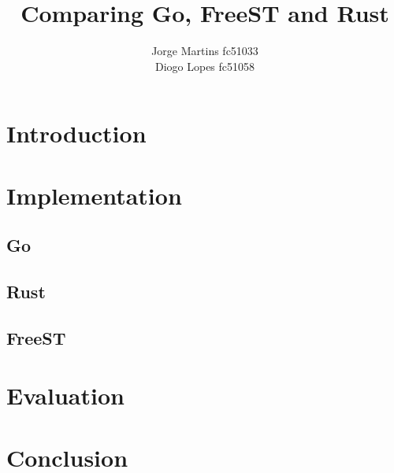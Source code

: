 \documentclass[10pt, a4paper, twocolumn]{article}
\title{Comparing Go, FreeST and Rust\\
}
\author{Jorge Martins  fc51033\\
Diogo Lopes fc51058}
\date{}
\begin{document}
\nocite{*}
\maketitle
\thispagestyle{empty}
\begin{abstract}
\lipsum[1]
\end{abstract}
\section{Introduction}
\lipsum
\section{Implementation}
\lipsum[1]
\subsection{Go}
\lipsum[1]
\subsection{Rust}
\lipsum[1]
\subsection{FreeST}
\lipsum[1]
\section{Evaluation}
\lipsum[1]
\section{Conclusion}
\lipsum


\end{document}
